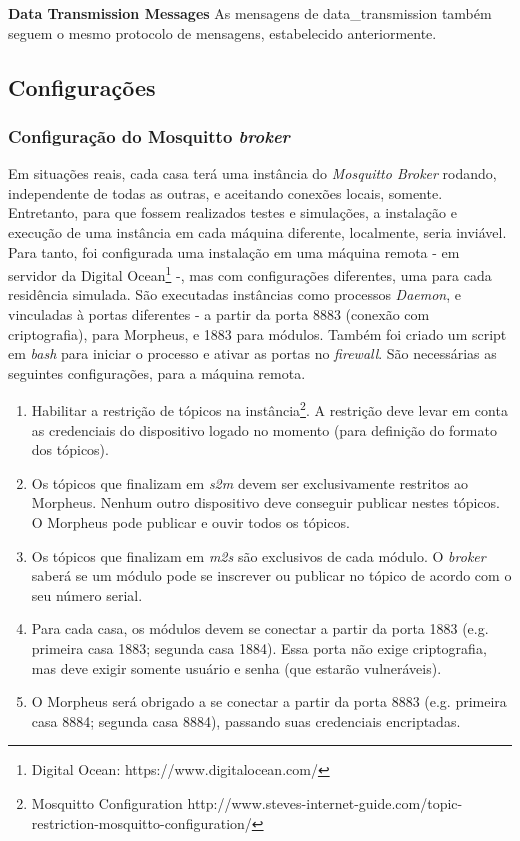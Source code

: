 \textbf{Data Transmission Messages}
As mensagens de data\_transmission também seguem o mesmo protocolo de mensagens, estabelecido anteriormente.

\subsection{Configurações}

\subsubsection{Configuração do \wmqtt{} Mosquitto \textit{broker}}

Em situações reais, cada casa terá uma instância do \emph{Mosquitto Broker} rodando, independente de todas as outras, e aceitando conexões locais, somente. Entretanto, para que fossem realizados testes e simulações, a instalação e execução de uma instância em cada máquina diferente, localmente, seria inviável. Para tanto, foi configurada uma instalação em uma máquina remota - em servidor da Digital Ocean\footnote{Digital Ocean: https://www.digitalocean.com/} -, mas com configurações diferentes, uma para cada residência simulada. São executadas instâncias como processos \emph{Daemon}, e vinculadas à portas diferentes - a partir da porta 8883 (conexão com criptografia), para Morpheus, e 1883 para módulos. Também foi criado um script em \emph{bash} para iniciar o processo e ativar as portas no \emph{firewall}. São necessárias as seguintes configurações, para a máquina remota.

\begin{enumerate}
\item Habilitar a restrição de tópicos na instância\footnote{Mosquitto Configuration http://www.steves-internet-guide.com/topic-restriction-mosquitto-configuration/}. A restrição deve levar em conta as credenciais do dispositivo logado no momento (para definição do formato dos tópicos).

\item Os tópicos que finalizam em \emph{s2m} devem ser exclusivamente restritos ao Morpheus. Nenhum outro dispositivo deve conseguir publicar nestes tópicos. O Morpheus pode publicar e ouvir todos os tópicos.

\item Os tópicos que finalizam em \emph{m2s} são exclusivos de cada módulo. O \emph{broker} saberá se um módulo pode se inscrever ou publicar no tópico de acordo com o seu número serial.

\item Para cada casa, os módulos devem se conectar a partir da porta 1883 (e.g. primeira casa \textrightarrow{} 1883; segunda casa \textrightarrow{} 1884). Essa porta não exige criptografia, mas deve exigir somente usuário e senha (que estarão vulneráveis).

\item O Morpheus será obrigado a se conectar a partir da porta 8883 (e.g. primeira casa \textrightarrow{} 8884; segunda casa \textrightarrow{} 8884), passando suas credenciais encriptadas.
\end{enumerate}

